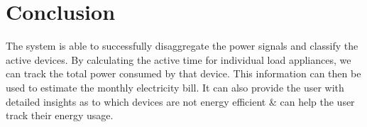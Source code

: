 \chapter{\Large{Conclusion}} \label{con}
The system is able to successfully disaggregate the power signals and classify the active devices. 
By calculating the active time for individual load appliances, we can track the total power consumed by that device. This information can then be used to estimate the monthly electricity bill. It can also provide the user with detailed insights as to which devices are not energy efficient & can help the user track their energy usage.
